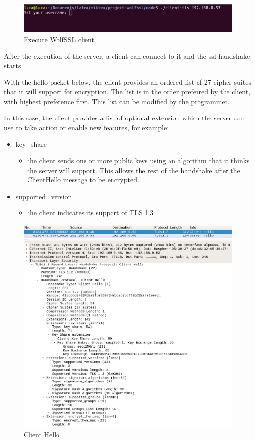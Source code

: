 \documentclass[a4paper,12pt]{article}
\begin{document}
\begin{figure}[H]
    \centering
    \includegraphics[scale=0.248]{./code/img/1-client.png}
    \caption{Execute WolfSSL client}
    
\end{figure}

After the execution of the server, a client can connect to it and the ssl handshake starts.

With the hello packet below, the client provides an ordered list of 27 cipher suites that it will support for encryption. The list is in the order preferred by the client, with highest preference first. This list can be modified by the programmer.

In this case, the client provides a list of optional extension which the server can use to take action or enable new features, for example:
\begin{itemize}
\item key\_share 
\begin{itemize}
\item the client sends one or more public keys using an algorithm that it thinks the server will support. This allows the rest of the handshake after the ClientHello message to be encrypted.
\end{itemize}
\item supported\_version
\begin{itemize}
\item the client indicates its support of TLS 1.3
\end{itemize}
\end{itemize}
\begin{figure}[H]
    \centering
    \includegraphics[scale=0.248]{./code/img/client-hello.png}
    \caption{Client Hello}
    
\end{figure}
\end{document}
